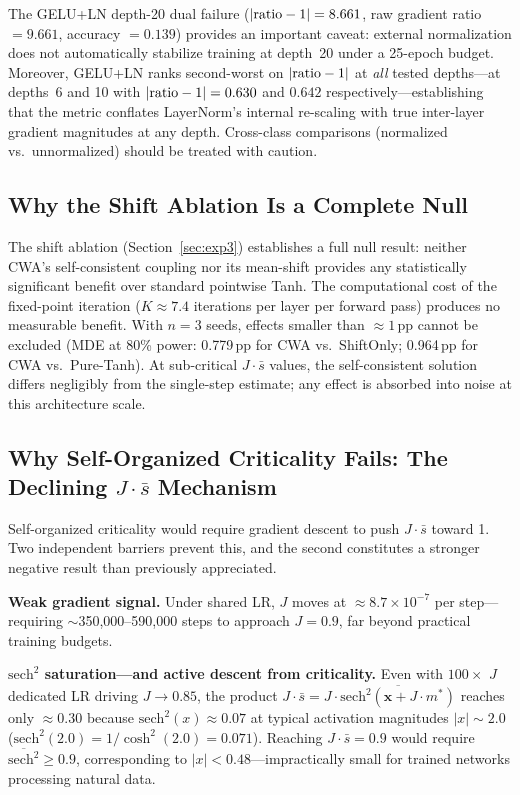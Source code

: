 \documentclass[11pt,twocolumn,letterpaper]{article}
\begin{document}
The GELU+LN depth-20 dual failure ($|{\rm ratio}-1| = 8.661$, raw gradient ratio $= 9.661$, accuracy $= 0.139$) provides
an important caveat: external normalization does not automatically stabilize training at depth~20 under a 25-epoch budget.
Moreover, GELU+LN ranks second-worst on $|{\rm ratio}-1|$ at \emph{all} tested depths---at depths~6 and 10 with
$|{\rm ratio}-1| = 0.630$ and $0.642$ respectively---establishing that the metric conflates LayerNorm's internal
re-scaling with true inter-layer gradient magnitudes at any depth. Cross-class comparisons (normalized vs.\ unnormalized)
should be treated with caution.

\subsection{Why the Shift Ablation Is a Complete Null}

The shift ablation (Section~\ref{sec:exp3}) establishes a full null result: neither CWA's self-consistent coupling nor its
mean-shift provides any statistically significant benefit over standard pointwise Tanh. The computational cost of the
fixed-point iteration ($K \approx 7.4$ iterations per layer per forward pass) produces no measurable benefit. With $n=3$
seeds, effects smaller than $\approx 1$\,pp cannot be excluded (MDE at 80\% power: 0.779\,pp for CWA vs.\ ShiftOnly;
0.964\,pp for CWA vs.\ Pure-Tanh). At sub-critical $J\cdot\bar{s}$ values, the self-consistent solution differs
negligibly from the single-step estimate; any effect is absorbed into noise at this architecture scale.

\subsection{\texorpdfstring{Why Self-Organized Criticality Fails: The Declining $J\cdot\bar{s}$ Mechanism}{Why Self-Organized Criticality Fails: The Declining J-s-bar Mechanism}}

Self-organized criticality would require gradient descent to push $J\cdot\bar{s}$ toward 1. Two independent barriers
prevent this, and the second constitutes a stronger negative result than previously appreciated.

\textbf{Weak gradient signal.} Under shared LR, $J$ moves at $\approx 8.7 \times 10^{-7}$ per step---requiring
$\sim$350,000--590,000 steps to approach $J = 0.9$, far beyond practical training budgets.

\textbf{$\text{sech}^2$ saturation---and active descent from criticality.} Even with $100\times$ $J$ dedicated LR driving
$J \to 0.85$, the product $J\cdot\bar{s} = J\cdot\overline{\text{sech}^2(\mathbf{x}+J\cdot m^*)}$ reaches only
$\approx 0.30$ because $\text{sech}^2(x) \approx 0.07$ at typical activation magnitudes $|x| \sim 2.0$
($\text{sech}^2(2.0) = 1/\cosh^2(2.0) = 0.071$). Reaching $J\cdot\bar{s} = 0.9$ would require
$\overline{\text{sech}^2} \geq 0.9$, corresponding to $|x| < 0.48$---impractically small for trained networks processing
natural data.
\end{document}
